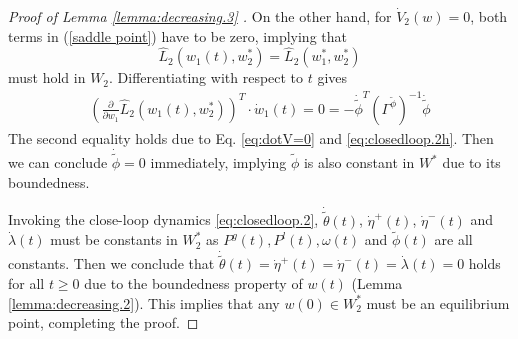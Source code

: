 \begin{proof} [Proof of Lemma \ref{lemma:decreasing.3} ]
   On the other hand, for $\dot V_2(w)=0$, both terms in  (\ref{saddle point}) have to be zero, implying that 
        	$$\hat L_2(w_1(t),w_2^*) = \hat L_2(w^*_1,w^*_2)$$
        	must hold in $W_2$. Differentiating with respect to $t$ gives
        	\begin{align}
	        	\left(\frac{\partial}{\partial w_1}\hat L_2(w_1(t),w_2^*)\right)^T\cdot\dot w_1(t)=0        	=-\dot{\tilde{\phi}}^T(\Gamma^{\tilde \phi}) ^{-1}\dot{\tilde{\phi}}
        	\end{align}
        	The second equality holds due to Eq. \eqref{eq:dotV=0} and \eqref{eq:closedloop.2h}. Then we can conclude $\dot{\tilde{\phi}}=0$ immediately, implying $\tilde{\phi}$ is also constant in $W^*$ due to its boundedness.        	
        	
%        	
%        	
	Invoking the close-loop dynamics  \eqref{eq:closedloop.2},  $\dot{\tilde{\theta}}(t)$, $\dot{\eta}^+(t)$, $\dot{\eta}^-(t)$ and $\dot{\lambda}(t)$ must be constants in $W_2^*$ as $P^{g}(t), P^l(t), \omega(t)$ and ${\tilde{\phi}}(t)$ are all constants. Then we conclude that $\dot{\tilde{\theta}}(t)= \dot{\eta}^+(t)=\dot{\eta}^-(t)=\dot{\lambda}(t)=0$ holds for all $t\ge 0$ due to the boundedness property of $w(t)$ (Lemma \ref{lemma:decreasing.2}).
       	This implies that any $w(0)\in W_2^*$ must be an equilibrium point,  completing the proof.
        \end{proof}
   
